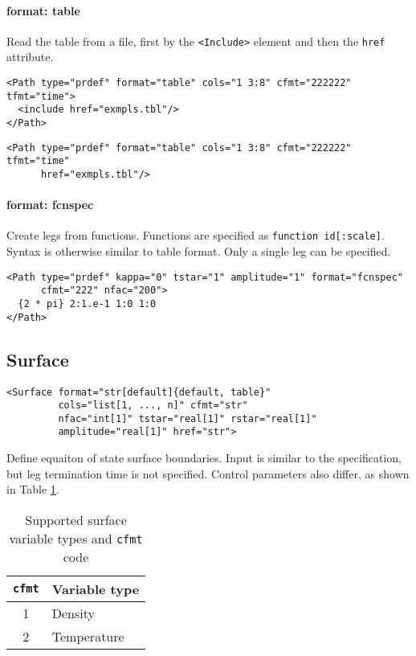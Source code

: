 \documentclass[11pt]{report}
\renewcommand{\tag}[1]{\texttt{<#1>}}
\newcommand{\reqdtag}[1]{\Red{\texttt{<#1>}}}
\newcommand{\supporting}[1]{\texttt{Supporting Drivers: #1}}
\begin{document}
\paragraph{format: table} Read the table from a file, first by the
\tag{Include} element and then the \texttt{href} attribute.
\begin{verbatim}
<Path type="prdef" format="table" cols="1 3:8" cfmt="222222" tfmt="time">
  <include href="exmpls.tbl"/>
</Path>
\end{verbatim}

\begin{verbatim}
<Path type="prdef" format="table" cols="1 3:8" cfmt="222222" tfmt="time"
      href="exmpls.tbl"/>
\end{verbatim}

\paragraph{format: fcnspec} Create legs from functions. Functions are specified
as \texttt{function id[:scale]}.  Syntax is otherwise similar to table format.
Only a single leg can be specified.
\begin{verbatim}
<Path type="prdef" kappa="0" tstar="1" amplitude="1" format="fcnspec"
      cfmt="222" nfac="200">
  {2 * pi} 2:1.e-1 1:0 1:0
</Path>
\end{verbatim}

\subsection{Surface}
\begin{verbatim}
<Surface format="str[default]{default, table}"
         cols="list[1, ..., n]" cfmt="str"
         nfac="int[1]" tstar="real[1]" rstar="real[1]"
         amplitude="real[1]" href="str">
\end{verbatim}
%
Define equaiton of state surface boundaries. Input is similar to the
\reqdtag{Path} specification, but leg termination time is not specified.
Control parameters also differ, as shown in Table \ref{tab:cfmt-1}.

\begin{table}[h!]
  \centering
  \begin{tabular}[h]{cl}
    \hline
    \hline
    \texttt{cfmt} & Variable type \\
    \hline
    1 & Density \\
    2 & Temperature
  \end{tabular}
  \caption{Supported surface variable types and \texttt{cfmt} code}
  \label{tab:cfmt-1}
\end{table}
\end{document}
